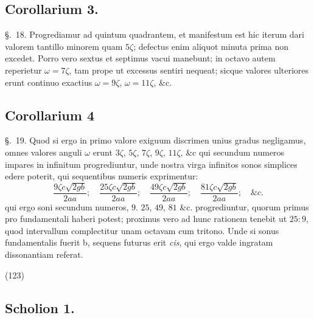 \documentclass[11pt,a4paper]{article}
\begin{document}
\subsection{Corollarium 3.}

§.~18. Progrediamur ad quintum quadrantem, et manifestum est hic iterum dari
valorem tantillo minorem quam $5\zeta$; defectus enim aliquot minuta prima non
excedet. Porro vero sextus et septimus vacui manebunt; in octavo autem reperietur
$\omega = 7\zeta$, tam prope ut excessus sentiri nequeat; sicque valores ulteriores
erunt continuo exactius $\omega = 9\zeta$, $\omega = 11\zeta$, \&c.

\subsection{Corollarium 4}

§.~19. Quod si ergo in primo valore exiguum discrimen unius gradus negligamus,
omnes valores anguli $\omega$ erunt $3\zeta$, $5\zeta$, $7\zeta$, $9\zeta$, $11\zeta$,
\&c qui secundum numeros impares in infinitum progrediuntur, unde nostra virga
infinitos sonos simplices edere poterit, qui sequentibus numeris exprimentur:
\[
\frac{9\zeta c\sqrt{2gb}}{2aa};\quad \frac{25\zeta c\sqrt{2gb}}{2aa};\quad
\frac{49\zeta c\sqrt{2gb}}{2aa};\quad \frac{81\zeta c\sqrt{2gb}}{2aa};\quad \&c.
\]
qui ergo soni secundum numeros, $9$. $25$, $49$, $81$ \&c. progrediuntur, quorum
primus pro fundamentali haberi potest; proximus vero ad hunc rationem tenebit ut
$25 : 9$, quod intervallum complectitur unam octavam cum tritono. Unde si sonus
fundamentalis fuerit b, sequens futurus erit \emph{cis}, qui ergo
 valde ingratam dissonantiam referat.

(123)

\subsection{Scholion 1.}
\end{document}
